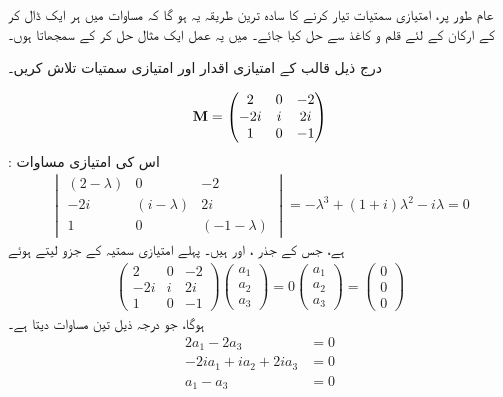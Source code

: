 عام طور پر، امتیازی سمتیات تیار کرنے کا  سادہ ترین طریقہ یہ ہو گا کہ مساوات   میں ہر ایک   ڈال کر  کے ارکان کے لئے قلم و کاغذ  سے حل کیا جائے۔ میں یہ عمل ایک مثال حل کر کے   سمجھاتا ہوں۔

درج ذیل قالب کے امتیازی اقدار اور امتیازی سمتیات تلاش کریں۔

\begin{align}
	\operatorname{\mathbf{M}}=
	\begin{pmatrix}
		2 & 0 & -2\\
		-2i & i & 2i\\
		1 & 0 & -1
	\end{pmatrix}
\end{align}
: اس کی امتیازی مساوات 
\begin{align}
	\begin{vmatrix}
		(2-\lambda) & 0 & -2\\
		-2i & (i-\lambda) & 2i\\
		1 & 0 & (-1-\lambda)
	\end{vmatrix}
		=-\lambda^3 + (1+i)\lambda^2-i\lambda = 0
\end{align}
ہے،  جس کے جذر ،   اور  ہیں۔ پہلے امتیازی سمتیہ کے     جزو   لیتے ہوئے
\begin{align*}
	\begin{pmatrix}
		2 & 0 & -2\\
		-2i & i & 2i\\
		1 & 0 & -1
	\end{pmatrix}
	\begin{pmatrix}
		a_1\\
		a_2\\
		a_3
	\end{pmatrix}
		=0
	\begin{pmatrix}
		a_1\\
		a_2\\
		a_3
	\end{pmatrix}
		=
	\begin{pmatrix}
		0\\0\\0
	\end{pmatrix}
\end{align*}
ہوگا،  جو درجہ ذیل تین مساوات دیتا ہے۔
\begin{align*}
	2a_1 - 2a_3 &= 0\\
	-2ia_1 + ia_2 + 2ia_3 &= 0\\
	a_1 - a_3 &= 0
\end{align*}
